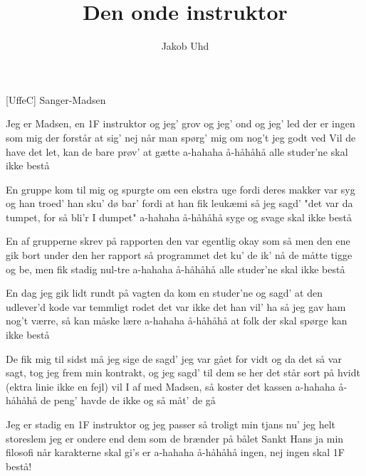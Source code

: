 \documentclass[a4paper,11pt]{article}
\title{Den onde instruktor}
\author{Jakob Uhd}
\begin{document}
\maketitle

\begin{roles}
[UffeC] Sanger-Madsen
\end{roles}

\begin{props}
\prop{}
\end{props}

\begin{song}
 Jeg er Madsen, en 1F instruktor
og jeg' grov og jeg' ond og jeg' led
der er ingen som mig
der forstår at sig' nej
når man spørg' mig om nog't jeg godt ved
Vil de have det let, kan de bare prøv' at gætte
a-hahaha
å-håhåhå
alle studer'ne skal ikke bestå

En gruppe kom til mig og spurgte
om een ekstra uge fordi
deres makker var syg
og han troed' han sku' dø
bar' fordi at han fik leukæmi
så jeg sagd' "det var da tumpet, for så bli'r I dumpet"
a-hahaha
å-håhåhå
syge og svage skal ikke bestå

En af grupperne skrev på rapporten
den var egentlig okay som så
men den ene gik bort
under den her rapport
så programmet det ku' de ik' nå
de måtte tigge og be, men fik stadig nul-tre
a-hahaha
å-håhåhå
alle studer'ne skal ikke bestå

En dag jeg gik lidt rundt på vagten
da kom en studer'ne og sagd'
at den udlever'd kode
var temmligt rodet
det var ikke det han vil' ha
så jeg gav ham nog't værre, så kan måske lære 
a-hahaha
å-håhåhå
at folk der skal spørge kan ikke bestå

De fik mig til sidst må jeg sige
de sagd' jeg var gået for vidt
og da det så var sagt,
tog jeg frem min kontrakt, 
og jeg sagd' til dem se her det står sort på hvidt (ektra linie ikke en fejl)
vil I af med Madsen, så koster det kassen
a-hahaha
å-håhåhå
de peng' havde de ikke og så måt' de gå 

Jeg er stadig en 1F instruktor
og jeg passer så troligt min tjans
nu' jeg helt storeslem
jeg er ondere end dem
som de brænder på bålet Sankt Hans
ja min filosofi når karakterne skal gi's er
a-hahaha
å-håhåhå
ingen, nej ingen skal 1F bestå!
\end{song}
\end{document}
